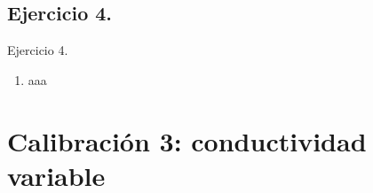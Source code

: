 \documentclass{beamer}
\newcommand{\Vector}[1]{{\mathbf{#1}}}
\begin{document}
%	
%		
%		
%		
%			
%			
%		
%	

\subsection{Ejercicio 4.}

\begin{frame}
	
\begin{exampleblock}{Ejercicio 4.}
\begin{enumerate}
\item aaa
\end{enumerate}
\end{exampleblock}
	
\end{frame}	


\section{Calibración 3: conductividad variable}
\end{document}
